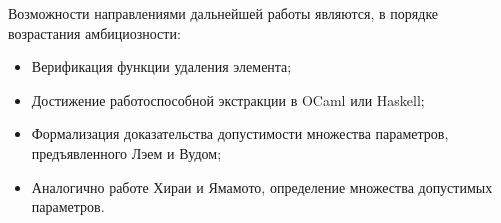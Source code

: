 \documentclass[a4paper,14pt]{extarticle}
\begin{document}
Возможности направлениями дальнейшей работы являются,
в порядке возрастания амбициозности:
\begin{itemize}
  \item Верификация функции удаления элемента;
  \item Достижение работоспособной экстракции в OCaml или Haskell;
  \item Формализация доказательства допустимости множества параметров,
    предъявленного Лэем и Вудом;
  \item Аналогично работе Хираи и Ямамото, определение множества допустимых
    параметров.
\end{itemize}

\clearpage
\printbibliography%
\end{document}

